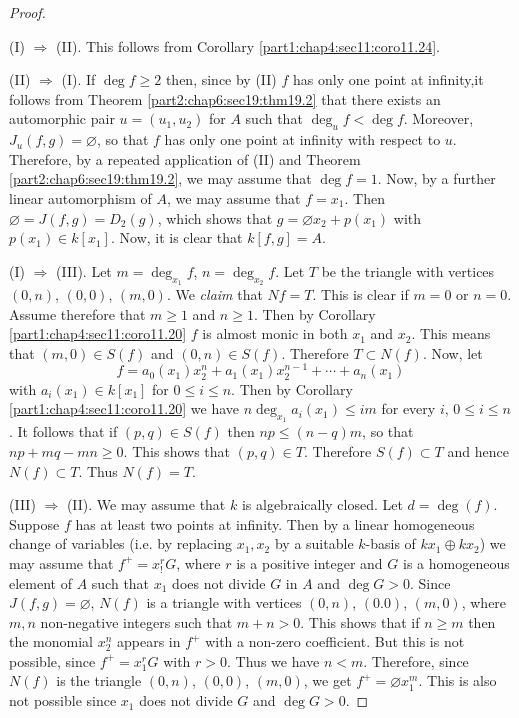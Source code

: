 \begin{proof}
~

  (I) $\Rightarrow$ (II). This follows from Corollary
  \ref{part1:chap4:sec11:coro11.24}.

  (II) $\Rightarrow$ (I). If $\deg f \geq 2$ then, since by (II) $f$
  has only one point at infinity,\pageoriginale it follows from
  Theorem \ref{part2:chap6:sec19:thm19.2} that there exists an
  automorphic pair $u= (u_1, u_2)$ for $A$ such that $\deg_u f < \deg
  f$. Moreover, $J_u (f, g)= \diameter$, so that $f$ has only one
  point at infinity with respect to $u$. Therefore, by a repeated
  application of (II) and Theorem \ref{part2:chap6:sec19:thm19.2}, we
  may assume that $\deg f=1$. Now, by a further linear automorphism of
  $A$, we may assume that $f = x_1$. Then $\diameter = J(f, g)= D_2
  (g)$, which shows that $g= \diameter x_2+ p(x_1)$ with $p(x_1) \in
  k[x_1]$. Now, it is clear that $k[f, g]=A$.

  (I) $\Rightarrow$ (III). Let $m= \deg_{x_1} f$, $n= \deg
  _{x_2}f$. Let $T$ be the triangle with vertices $(0, n)$, $(0,0)$,
  $(m, 0)$. We {\em claim} that $N{f}=T$. This is clear if $m=0$ or
  $n=0$. Assume therefore that $m \geq 1$ and $n \geq 1$. Then by
  Corollary \ref{part1:chap4:sec11:coro11.20} $f$ is almost monic in
  both $x_1$ and $x_2$. This means that $(m, 0) \in S(f)$ and $(0,
  n)\in S(f)$. Therefore $T \subset N(f)$. Now, let
  $$
  f= a_0 (x_1) x_2^n + a_1 (x_1) x_2^{n-1} + \cdots + a_n (x_1)
  $$
  with $a_i (x_1) \in k [x_1]$ for $0 \leq i \leq n$. Then by
  Corollary \ref{part1:chap4:sec11:coro11.20} we have $n \deg_{x_1}
  a_i (x_1)\leq im$ for every $i$, $0 \leq i \leq n$. It follows that
  if $(p, q) \in S(f)$ then $n p\leq (n-q)m$, so that $np+mq-mn \geq
  0$. This shows that $(p, q) \in T$. Therefore $S(f) \subset T$ and
  hence $N(f)\subset T$. Thus $N(f) = T$.

  (III) $\Rightarrow$ (II). We may assume that $k$ is algebraically
  closed. Let $d= \deg (f)$. Suppose $f$ has at least two points at
  infinity. Then by a linear homogeneous change of variables (i.e. by
  replacing $x_1, x_2$ by a suitable $k$-basis of $kx_1 \oplus kx_2$)
  we may assume that $f^+= x_!^r G$, where $r$ is a positive integer
  and $G$ is a homogeneous element of $A$ such that $x_1$ does not
  divide $G$ in $A$ and $\deg G >0$. Since $J(f, g)= \diameter$,
  $N(f)$ is a triangle with vertices $(0, n)$, $(0.0)$, $(m, 0)$,
  where\pageoriginale $m, n$ non-negative integers such that $m+n >
  0$. This shows that if $n\geq m$ then the monomial $x_2^n$ appears
  in $f^+$ with a non-zero coefficient. But this is not possible,
  since $f^+= x_1^r G$ with $r>0$. Thus we have $n< m$. Therefore,
  since $N(f)$ is the triangle $(0, n)$, $(0, 0)$, $(m, 0)$, we get
  $f^+ = \diameter x_1^m$. This is also not possible since $x_1$ does
  not divide $G$ and $\deg G> 0$. 


\end{proof}
